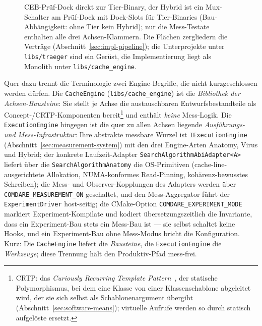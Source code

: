 \begin{nurlang}
\begin{figure}[htbp]
{CEB-Prüf-Dock direkt zur Tier-Binary, der Hybrid ist ein Mux-Schalter am Prüf-Dock mit Dock-Slots für Tier-Binaries
(Bau-Abhängigkeit: ohne Tier kein Hybrid); nur die Mess-Testate enthalten alle drei Achsen-Klammern. Die Flächen
zergliedern die Verträge (Abschnitt~\ref{sec:impl-pipeline}); die Unterprojekte unter \texttt{libs/traeger}
sind ein Gerüst, die Implementierung liegt als Monolith unter \texttt{libs/cache\_engine}.}\label{fig:traeger-stufen}
\end{figure}
Quer dazu trennt die Terminologie zwei Engine-Begriffe, die nicht kurzgeschlossen werden dürfen. Die
\texttt{CacheEngine} (\texttt{libs/\allowbreak{}cache\_\allowbreak{}engine}) ist die \emph{Bibliothek der Achsen-Bausteine}:
Sie stellt je Achse die austauschbaren Entwurfsbestandteile als Concept-/CRTP-Komponenten
bereit\footnote{CRTP\@: das \emph{Curiously Recurring Template Pattern}~\cite{coplien1995crtp}, der statische
Polymorphismus, bei dem eine Klasse von einer Klassenschablone abgeleitet wird, der sie sich selbst als
Schablonenargument übergibt (Abschnitt~\ref{sec:software-means}); virtuelle Aufrufe werden so durch statisch
aufgelöste ersetzt.} und enthält \emph{keine} Mess-Logik. Die \texttt{ExecutionEngine} hingegen ist die quer
zu allen Achsen liegende \emph{Ausführungs- und Mess-Infrastruktur}: Ihre abstrakte messbare Wurzel ist
\texttt{IExecutionEngine} (Abschnitt~\ref{sec:measurement-system}) mit den drei Engine-Arten Anatomy, Virus
und Hybrid; der konkrete Laufzeit-Adapter \texttt{SearchAlgorithmAbiAdapter<A>} liefert über die
\texttt{SearchAlgorithmAnatomy} die OS-Primitiven (cache-line-ausgerichtete Allokation, NUMA-konformes
Read-Pinning, kohärenz-bewusstes Schreiben); die Mess- und Observer-Kopplungen des Adapters werden über
\texttt{COMDARE\_\allowbreak{}MEASUREMENT\_\allowbreak{}ON} geschaltet, und den Mess-Aggregator führt der
\texttt{ExperimentDriver} host-seitig; die CMake-Option
\texttt{COMDARE\_\allowbreak{}EXPERIMENT\_\allowbreak{}MODE} markiert Experiment-Kompilate und kodiert
übersetzungszeitlich die Invariante, dass ein Experiment-Bau stets ein Mess-Bau ist --- sie selbst
schaltet keine Hooks, und ein Experiment-Bau ohne Mess-Modus bricht die Konfiguration. Kurz: Die
\texttt{CacheEngine} liefert die \emph{Bausteine}, die \texttt{ExecutionEngine} die \emph{Werkzeuge}; diese
Trennung hält den Produktiv-Pfad mess-frei.


\end{nurlang}
